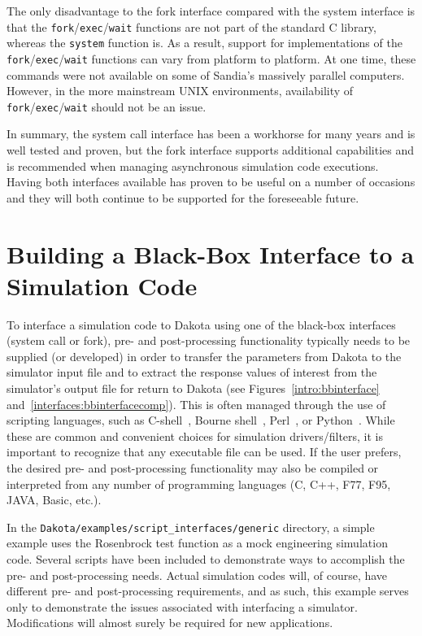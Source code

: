 The only disadvantage to the fork interface compared with
the system interface is that the
\texttt{fork}/\texttt{exec}/\texttt{wait} functions are not part of
the standard C library, whereas the \texttt{system} function is. As a
result, support for implementations of the
\texttt{fork}/\texttt{exec}/\texttt{wait} functions can vary from
platform to platform. At one time, these commands were not available
on some of Sandia's massively parallel computers. However, in the more
mainstream UNIX environments, availability of
\texttt{fork}/\texttt{exec}/\texttt{wait} should not be an issue.

In summary, the system call interface has been a workhorse for many
years and is well tested and proven, but the fork interface
supports additional capabilities and is recommended when managing
asynchronous simulation code executions. Having both interfaces
available has proven to be useful on a number of occasions and they
will both continue to be supported for the foreseeable future.


\section{Building a Black-Box Interface to a Simulation Code}\label{interfaces:building}

To interface a simulation code to Dakota using one of the black-box
interfaces (system call or fork), pre- and post-processing
functionality typically needs to be supplied (or developed) in order
to transfer the parameters from Dakota to the simulator input file and
to extract the response values of interest from the simulator's output
file for return to Dakota (see Figures~\ref{intro:bbinterface}
and~\ref{interfaces:bbinterfacecomp}). This is often managed through
the use of scripting languages, such as C-shell~\cite{And86}, Bourne
shell~\cite{Bli96}, Perl~\cite{Wal96}, or Python~\cite{Mar03}. While
these are common and convenient choices for simulation
drivers/filters, it is important to recognize that any executable file
can be used. If the user prefers, the desired pre- and post-processing
functionality may also be compiled or interpreted from any number of
programming languages (C, C++, F77, F95, JAVA, Basic, etc.).

In the \texttt{Dakota/examples/script\_interfaces/generic} directory,
a simple example uses the Rosenbrock test function as a mock
engineering simulation code. Several scripts have been included to
demonstrate ways to accomplish the pre- and post-processing
needs. Actual simulation codes will, of course, have different pre-
and post-processing requirements, and as such, this example serves
only to demonstrate the issues associated with interfacing a
simulator. Modifications will almost surely be required for new
applications.

